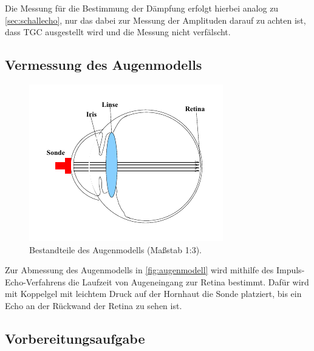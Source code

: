 Die Messung für die Bestimmung der Dämpfung erfolgt hierbei analog zu \autoref{sec:schallecho}, 
nur das dabei zur Messung der Amplituden darauf zu achten ist, dass TGC ausgestellt wird und die Messung nicht verfälscht.


\subsection{Vermessung des Augenmodells}

\begin{figure}
    \centering
    \includegraphics[width=0.4\linewidth]{pictures/auge.pdf}
    \caption{Bestandteile des Augenmodells (Maßstab 1:3). \cite{us1}}
    \label{fig:augenmodell}
\end{figure}

Zur Abmessung des Augenmodells in \autoref{fig:augenmodell} wird mithilfe des Impuls-Echo-Verfahrens die Laufzeit von Augeneingang zur Retina bestimmt.
Dafür wird mit Koppelgel mit leichtem Druck auf der Hornhaut die Sonde platziert, bis ein Echo an der Rückwand der Retina zu sehen ist.


\subsection{Vorbereitungsaufgabe}

